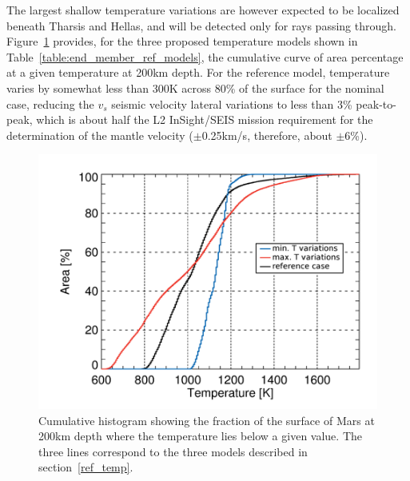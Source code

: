The largest shallow temperature variations are however expected to be localized beneath Tharsis and Hellas, and will be detected only for rays passing through. Figure~\ref{fig:Fig3-3-3-2.png} provides, for the three proposed temperature models shown in Table~\ref{table:end_member_ref_models}, the cumulative curve of area percentage at a given temperature at 200km depth.  For the reference model, temperature varies by somewhat less than 300K across 80\% of the surface for the nominal case, reducing the  $v_s$ seismic velocity lateral variations to less than 3\% peak-to-peak, which is  about half the L2 InSight/SEIS mission requirement for the determination of the mantle velocity ($\pm$0.25km/s, therefore, about $\pm$6\%).

\begin{figure}[h!]
\begin{center}
\includegraphics[scale=0.95]
{figures/Fig3-3-3-2.png}
\caption{Cumulative histogram showing the fraction of the surface of Mars at 200km depth where the temperature lies below a given value. The three lines correspond to the three models described in section~\ref{ref_temp}.}
\label{fig:Fig3-3-3-2.png} 
\end{center}
\end{figure}


